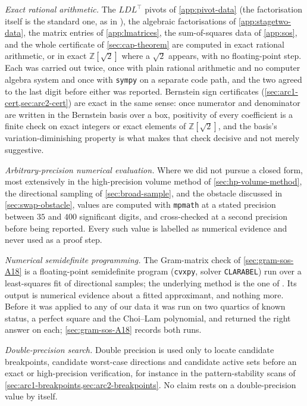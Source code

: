 \documentclass[11pt,reqno]{amsart}
\renewcommand{\_}{\origunderscore\allowbreak}
\numberwithin{equation}{section}
\theoremstyle{plain}
\theoremstyle{definition}
\theoremstyle{remark}
\begin{document}
\emph{Exact rational arithmetic.} The $LDL^\top$ pivots of
\cref{app:pivot-data} (the factorisation itself is the standard one, as
in \cite[\S4.1]{GVL13}), the algebraic factorisations of
\cref{app:stagetwo-data}, the matrix entries of \cref{app:lmatrices},
the sum-of-squares data of \cref{app:sos}, and the whole certificate of
\cref{sec:cap-theorem} are computed in exact rational arithmetic, or in
exact $\mathbb{Z}[\sqrt2]$ where a $\sqrt2$ appears, with no
floating-point step. Each was carried out twice, once with plain
rational arithmetic and no computer algebra system and once with
\texttt{sympy} \cite{Meu17} on a separate code path, and the two agreed
to the last digit before either was reported. Bernstein sign
certificates (\cref{sec:arc1-cert,sec:arc2-cert}) are exact in the same
sense: once numerator and denominator are written in the Bernstein basis
over a box, positivity of every coefficient is a finite check on exact
integers or exact elements of $\mathbb{Z}[\sqrt2]$, and the basis's
variation-diminishing property \cite{Far12} is what makes that check decisive and not merely suggestive.

\emph{Arbitrary-precision numerical evaluation.} Where we did not pursue
a closed form, most extensively in the high-precision volume method of
\cref{sec:hp-volume-method}, the directional sampling of
\cref{sec:broad-sample}, and the obstacle discussed in
\cref{sec:swap-obstacle}, values are computed with \texttt{mpmath} at a
stated precision between $35$ and $400$ significant digits, and
cross-checked at a second precision before being reported. Every such
value is labelled as numerical evidence and never used as a proof step.

\emph{Numerical semidefinite programming.} The Gram-matrix check of
\cref{sec:gram-sos-A18} is a floating-point semidefinite program
(\texttt{cvxpy}, solver \texttt{CLARABEL}) run over a least-squares fit
of directional samples; the underlying method is the one of
\cite{Par03,Las01}. Its output is numerical evidence about a fitted
approximant, and nothing more. Before it was applied to any of our data
it was run on two quartics of known status, a perfect square and the
Choi--Lam polynomial, and returned the right answer on each;
\cref{sec:gram-sos-A18} records both runs.

\emph{Double-precision search.} Double precision is used only to locate
candidate breakpoints, candidate worst-case directions and candidate
active sets before an exact or high-precision verification, for instance
in the pattern-stability scans of
\cref{sec:arc1-breakpoints,sec:arc2-breakpoints}. No claim rests on a
double-precision value by itself.
\end{document}
